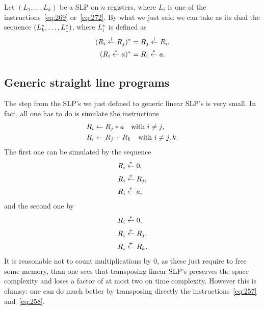 \begin{remark}
  Let $(L_1,\ldots,L_k)$ be a SLP on $n$ registers, where $L_i$ is one
  of the instructions~\eqref{eq:269} or~\eqref{eq:272}. By what we
  just said we can take as its dual the sequence
  $(L_k^\ast,\ldots,L_1^\ast)$, where $L_i^\ast$ is defined as
  \begin{align}
    \label{eq:273}
    (R_i\overset{+}{\leftarrow}R_j)^\ast &= R_j\overset{+}{\leftarrow}R_i\text{,}\\
    (R_i\overset{*}{\leftarrow}a)^\ast &= R_i\overset{*}{\leftarrow}a\text{.}
  \end{align}
\end{remark}


\subsection{Generic straight line programs}
\label{sec:gener-stra-line}
The step from the SLP's we just defined to generic linear SLP's is
very small. In fact, all one has to do is simulate the instructions
\begin{align}
  \label{eq:257}
  R_i &\leftarrow R_j*a\quad\text{with $i\ne j$,}\\
  \label{eq:258}
  R_i &\leftarrow R_j + R_k\quad\text{with $i\ne j,k$.}
\end{align}
The first one can be simulated by the sequence
\begin{equation}
  \label{eq:259}
  \begin{aligned}
    R_i &\overset{*}{\leftarrow} 0\text{,}\\
    R_i &\overset{+}{\leftarrow} R_j\text{,}\\
    R_i &\overset{*}{\leftarrow} a\text{;}
  \end{aligned}
\end{equation}
and the second one by
\begin{equation}
  \label{eq:260}
  \begin{aligned}
    R_i &\overset{*}{\leftarrow} 0\text{,}\\
    R_i &\overset{+}{\leftarrow} R_j\text{,}\\
    R_i &\overset{+}{\leftarrow} R_k\text{.}
  \end{aligned}
\end{equation}
It is reasonable not to count multiplications by $0$, as these just
require to free some memory, than one sees that transposing linear
SLP's preserves the space complexity and loses a factor of at most two
on time complexity. However this is clumsy: one can do much better by
transposing directly the instructions~\eqref{eq:257}
and~\eqref{eq:258}.

